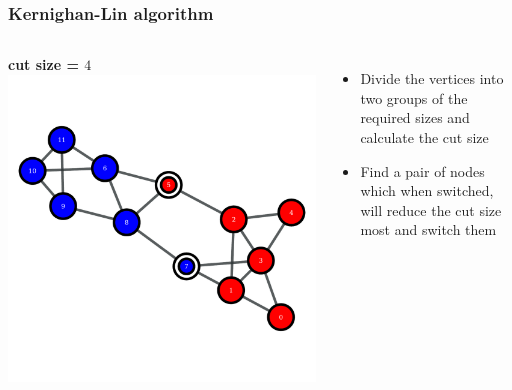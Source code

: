 \documentclass{beamer}
\begin{document}
\begin{frame}
    \frametitle{Kernighan-Lin algorithm}
    \begin{columns}
        \centering
        {\bf cut size = $4$}
        \includegraphics[width=0.8\columnwidth]{kl1.pdf}

        \centering
        \begin{itemize}
            \setlength\itemsep{1em}
            \item{\small Divide the vertices into two groups of the required sizes and calculate the cut size}
                \pause
            \item{\small Find a pair of nodes which when switched, will reduce the cut size most and switch them}
        \end{itemize}
    \end{columns}
\end{frame}
\end{document}
